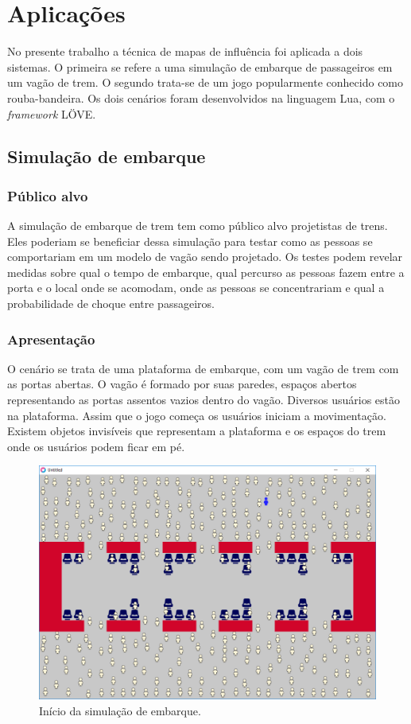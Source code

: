 \documentclass[a4paper]{article}
\begin{document}
\section{Aplicações}

No presente trabalho a técnica de mapas de influência foi aplicada a dois sistemas. O primeira se refere a uma simulação de embarque de passageiros em um vagão de trem. O segundo trata-se de um jogo popularmente conhecido como rouba-bandeira. Os dois cenários foram desenvolvidos na linguagem Lua, com o \textit{framework} LÖVE.

\subsection{Simulação de embarque}

\subsubsection{Público alvo}

A simulação de embarque de trem tem como público alvo projetistas de trens. Eles poderiam se beneficiar dessa simulação para testar como as pessoas se comportariam em um modelo de vagão sendo projetado. Os testes podem revelar medidas sobre qual o tempo de embarque, qual percurso as pessoas fazem entre a porta e o local onde se acomodam, onde as pessoas se concentrariam e qual a probabilidade de choque entre passageiros.

\subsubsection{Apresentação}

O cenário se trata de uma plataforma de embarque, com um vagão de trem com as portas abertas. O vagão é formado por suas paredes, espaços abertos representando as portas assentos vazios dentro do vagão. Diversos usuários estão na plataforma. Assim que o jogo começa os usuários iniciam a movimentação. Existem objetos invisíveis que representam a plataforma e os espaços do trem onde os usuários podem ficar em pé.

\begin{figure}
\centering
\includegraphics[width=1\textwidth]{train.png}
\caption{\label{fig:train} Início da simulação de embarque.}
\end{figure}
\end{document}
